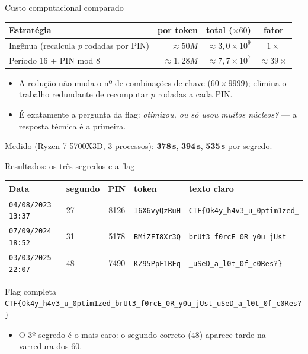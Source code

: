 \documentclass[aspectratio=169]{beamer}
\begin{document}
\begin{frame}{Custo computacional comparado}
  \begin{center}
  \begin{tabular}{@{}l r r c@{}}
    Estratégia & por token & total ($\times60$) & fator\\
    \hline
    Ingênua (recalcula $p$ rodadas por PIN) & $\approx 50M$ & $\approx 3{,}0\times10^{9}$ & $1\times$\\
    Período 16 + PIN mod 8 & $\approx 1{,}28M$ & $\approx 7{,}7\times10^{7}$ & \alert{$\approx 39\times$}\\
  \end{tabular}
  \end{center}
  \vspace{0.5em}
  \begin{itemize}
    \item A redução \alert{não} muda o nº de combinações de chave
          ($60\times9999$); elimina o \alert{trabalho redundante} de recomputar
          $p$ rodadas a cada PIN.
    \item É exatamente a pergunta da flag: \emph{otimizou, ou só usou muitos
          núcleos?} --- a resposta técnica é a primeira.
  \end{itemize}
  \begin{center}
    {\small Medido (Ryzen 7 5700X3D, 3 processos): \textbf{378\,s}, \textbf{394\,s},
    \textbf{535\,s} por segredo.}
  \end{center}
\end{frame}

\begin{frame}{Resultados: os três segredos e a flag}
  \begin{center}
  \begin{tabular}{@{}l l c l l@{}}
    Data & segundo & PIN & token & texto claro\\
    \hline
    \texttt{04/08/2023 13:37} & 27 & 8126 & \texttt{I6X6vyQzRuH} & \texttt{CTF\{Ok4y\_h4v3\_u\_0ptim1zed\_}\\
    \texttt{07/09/2024 18:52} & 31 & 5178 & \texttt{BMiZFI8Xr3Q} & \texttt{brUt3\_f0rcE\_0R\_y0u\_jUst}\\
    \texttt{03/03/2025 22:07} & 48 & 7490 & \texttt{KZ95PpF1RFq} & \texttt{\_uSeD\_a\_l0t\_0f\_c0Res?\}}\\
  \end{tabular}
  \end{center}
  \vspace{0.4em}
  \begin{block}{Flag completa}
    \texttt{CTF\{Ok4y\_h4v3\_u\_0ptim1zed\_brUt3\_f0rcE\_0R\_y0u\_jUst\_uSeD\_a\_l0t\_0f\_c0Res?\}}
  \end{block}
  \begin{itemize}
    \item O 3º segredo é o mais caro: o segundo correto (48) aparece tarde na
          varredura dos 60.
  \end{itemize}
\end{frame}
\end{document}
